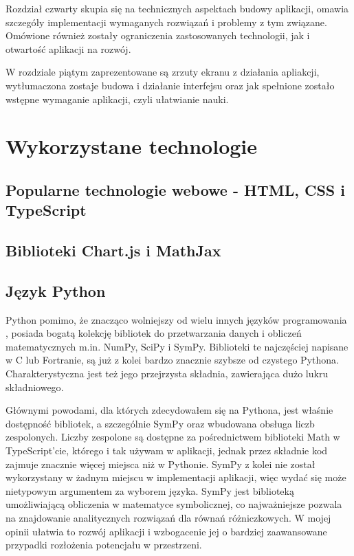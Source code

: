 \documentclass{SGGW-thesis}
\begin{document}
	Rozdział czwarty skupia się na technicznych aspektach budowy aplikacji, omawia szczegóły implementacji wymaganych rozwiązań i problemy z tym związane. Omówione również zostały ograniczenia zastosowanych technologii, jak i otwartość aplikacji na rozwój.
	
	W rozdziale piątym zaprezentowane są zrzuty ekranu z działania apliakcji, wytłumaczona zostaje budowa i działanie interfejsu oraz jak spełnione zostało wstępne wymaganie aplikacji, czyli ułatwianie nauki.
	
	
\chapter{Wykorzystane technologie}
	\section{Popularne technologie webowe - HTML, CSS i TypeScript}
	\section{Biblioteki Chart.js i MathJax}
	\section{Język Python}
	Python pomimo, że znacząco wolniejszy od wielu innych języków programowania \cite{Python slow}, posiada bogatą kolekcję bibliotek do przetwarzania danych i obliczeń matematycznych m.in. NumPy, SciPy i SymPy. Biblioteki te najczęściej napisane w C lub Fortranie, są już z kolei bardzo znacznie szybsze od czystego Pythona\cite{Python libs}. Charakterystyczna jest też jego przejrzysta składnia, zawierająca dużo lukru składniowego\cite{Python sugar}.
	
	Głównymi powodami, dla których zdecydowałem się na Pythona, jest właśnie dostępność bibliotek, a szczególnie SymPy oraz wbudowana obsługa liczb zespolonych. Liczby zespolone są dostępne za pośrednictwem biblioteki Math w TypeScript'cie\cite{TS Math}, którego i tak używam w aplikacji, jednak przez składnie kod zajmuje znacznie więcej miejsca niż w Pythonie. SymPy z kolei nie został wykorzystany w żadnym miejscu w implementacji aplikacji, więc wydać się może nietypowym argumentem za wyborem języka. SymPy jest biblioteką umożliwiającą obliczenia w matematyce symbolicznej\cite{SymPy}, co najważniejsze pozwala na znajdowanie analitycznych rozwiązań dla równań różniczkowych. W mojej opinii ułatwia to rozwój aplikacji i wzbogacenie jej o bardziej zaawansowane przypadki rozłożenia potencjału w przestrzeni.
	
\end{document}
